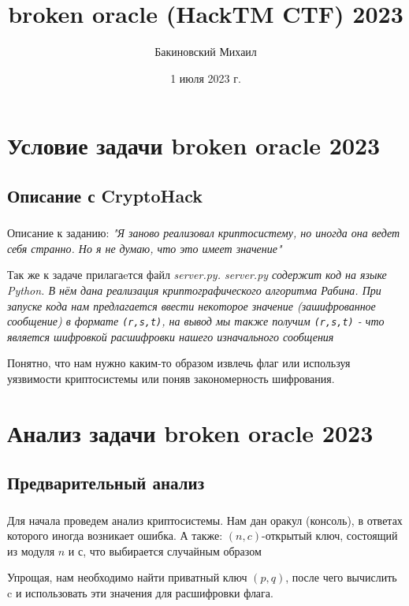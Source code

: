 \documentclass[t]{beamer}
\title{broken oracle (HackTM CTF) 2023}
\author{Бакиновский Михаил}
\date{1 июля 2023 г.}
\institute[БФУ им. Иммануила Канта]{БФУ им. Иммануила Канта\\ ОНК «Институт высоких технологий» \\ Компьютерная безопасность, 3 курс}
\begin{document}
\frame[plain]{\titlepage}	%

\section{Условие задачи broken oracle 2023}
\subsection{Описание с CryptoHack}
\begin{frame}
	\frametitle{\insertsection}
	\framesubtitle{\insertsubsection}
    \begin{itemize}
        Описание к заданию: \slshape"Я заново реализовал криптосистему, но иногда она ведет себя странно. Но я не думаю, что это имеет значение"\upshape\newline\newline
        
        Так же к задаче прилагаeтся файл \slshape server.py.  \upshape \newline server.py содержит код на языке Python. В нём дана реализация криптографического алгоритма Рабина. При запуске кода нам предлагается ввести некоторое значение (зашифрованное сообщение) в формате \texttt{(r,s,t)}, на вывод мы также получим \texttt{(r,s,t)} - что является шифровкой расшифровки нашего изначального сообщения\newline\newline
    
        Понятно, что нам нужно каким-то образом извлечь флаг или используя уязвимости криптосистемы или поняв закономерность шифрования.
    \end{itemize}
\end{frame}

\section{Анализ задачи broken oracle 2023}
\subsection{Предварительный анализ}
\begin{frame}
	\frametitle{\insertsection}
	\framesubtitle{\insertsubsection}
    \begin{itemize}
        Для начала проведем анализ криптосистемы.
        Нам дан оракул (консоль), в ответах которого иногда возникает ошибка. А также:\newline\newline
        ${(n,c)}$-открытый ключ, состоящий из модуля ${n}$ и ${с}$, что выбирается случайным образом \newline\newline

        Упрощая, нам необходимо найти приватный ключ ${(p,q)}$, после чего вычислить c и использовать эти значения для расшифровки флага.
    \end{itemize}
\end{frame}
\end{document}
